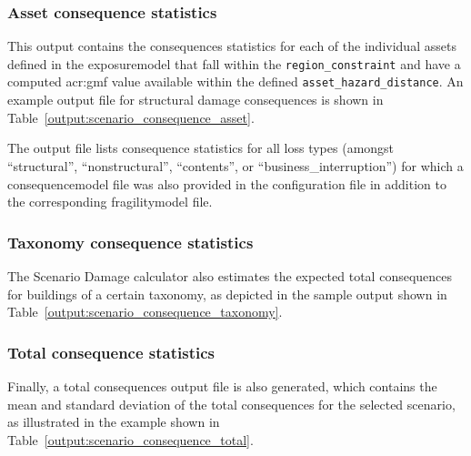 \subsubsection{Asset consequence statistics}
\label{subsubsec:scenario_asset_consequence_statistics}

This output contains the consequences statistics for each of the individual
\glspl{asset} defined in the \gls{exposuremodel} that fall within the
\Verb+region_constraint+ and have a computed \gls{acr:gmf} value available
within the defined \Verb+asset_hazard_distance+. An example output file for
structural damage consequences is shown in
Table~\ref{output:scenario_consequence_asset}.



The output file lists consequence statistics for all loss types (amongst
``structural'', ``nonstructural'', ``contents'', or
``business\_interruption'') for which a \gls{consequencemodel} file was also
provided in the configuration file in addition to the corresponding
\gls{fragilitymodel} file.


\subsubsection{Taxonomy consequence statistics}
\label{subsubsec:scenario_taxonomy_consequence_statistics}

The Scenario Damage calculator also estimates the expected total consequences
for buildings of a certain \gls{taxonomy}, as depicted in the sample output
shown in Table~\ref{output:scenario_consequence_taxonomy}.




\subsubsection{Total consequence statistics}
\label{subsubsec:scenario_total_consequence_statistics}

Finally, a total consequences output file is also generated, which contains
the mean and standard deviation of the total consequences for the selected
scenario, as illustrated in the example shown in
Table~\ref{output:scenario_consequence_total}.


